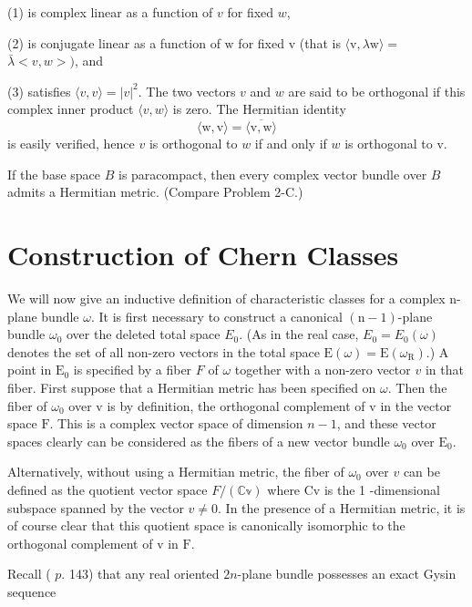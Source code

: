 \documentclass[10pt]{article}
\begin{document}
(1) is complex linear as a function of $v$ for fixed $w$,

(2) is conjugate linear as a function of $\mathrm{w}$ for fixed $\mathrm{v}$ (that is $\langle\mathrm{v}, \lambda \mathrm{w}\rangle=$ $\bar{\lambda}<v, w>)$, and

(3) satisfies $\langle v, v\rangle=|v|^{2}$. The two vectors $v$ and $w$ are said to be orthogonal if this complex inner product $\langle v, w\rangle$ is zero. The Hermitian identity
$$
\langle\mathrm{w}, \mathrm{v}\rangle=\overline{\langle\mathrm{v}, \mathrm{w}\rangle}
$$
is easily verified, hence $v$ is orthogonal to $w$ if and only if $w$ is orthogonal to $\mathrm{v}$.

If the base space $B$ is paracompact, then every complex vector bundle over $B$ admits a Hermitian metric. (Compare Problem 2-C.)

\section{Construction of Chern Classes}
We will now give an inductive definition of characteristic classes for a complex n-plane bundle $\omega$. It is first necessary to construct a canonical $(\mathrm{n}-1)$-plane bundle $\omega_{0}$ over the deleted total space $E_{0}$. (As in the real case, $E_{0}=E_{0}(\omega)$ denotes the set of all non-zero vectors in the total space $\mathrm{E}(\omega)=\mathrm{E}\left(\omega_{\mathrm{R}}\right)$.) A point in $\mathrm{E}_{0}$ is specified by a fiber $F$ of $\omega$ together with a non-zero vector $v$ in that fiber. First suppose that a Hermitian metric has been specified on $\omega$. Then the fiber of $\omega_{0}$ over $\mathrm{v}$ is by definition, the orthogonal complement of $\mathrm{v}$ in the vector space $\mathrm{F}$. This is a complex vector space of dimension $n-1$, and these vector spaces clearly can be considered as the fibers of a new vector bundle $\omega_{0}$ over $\mathrm{E}_{0}$.

Alternatively, without using a Hermitian metric, the fiber of $\omega_{0}$ over $v$ can be defined as the quotient vector space $F /(\mathbb{C v})$ where $\mathrm{Cv}$ is the 1 -dimensional subspace spanned by the vector $v \neq 0$. In the presence of a Hermitian metric, it is of course clear that this quotient space is canonically isomorphic to the orthogonal complement of $\mathrm{v}$ in $\mathrm{F}$.

Recall ( $p$. 143) that any real oriented $2 n$-plane bundle possesses an exact Gysin sequence
\end{document}

